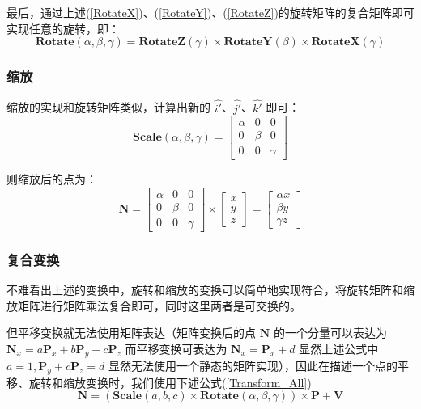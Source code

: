 \documentclass[12pt,oneside,a4paper]{ctexart}
\begin{document}
最后，通过上述(\ref{RotateX})、(\ref{RotateY})、(\ref{RotateZ})的旋转矩阵的复合矩阵即可实现任意的旋转，即：
\begin{equation*}
	\mathbf{Rotate}(\alpha,\beta,\gamma)=\mathbf{RotateZ}(\gamma)\times{}\mathbf{RotateY}(\beta)\times{}\mathbf{RotateX}(\gamma)
\end{equation*}
\subsubsection{缩放}

缩放的实现和旋转矩阵类似，计算出新的 $\hat{i'}$、$\hat{j'}$、$\hat{k'}$ 即可：
\begin{equation*}
	\mathbf{Scale}(\alpha,\beta,\gamma)=\begin{bmatrix}
		\alpha & 0     & 0      \\
		0      & \beta & 0      \\
		0      & 0     & \gamma
	\end{bmatrix}
\end{equation*}

则缩放后的点为：
\begin{equation*}
	\mathbf{N}=\begin{bmatrix}
		\alpha & 0     & 0      \\
		0      & \beta & 0      \\
		0      & 0     & \gamma
	\end{bmatrix}
	\times
	\begin{bmatrix}
		x \\
		y \\
		z
	\end{bmatrix}=
	\begin{bmatrix}
		\alpha{}x \\
		\beta{}y  \\
		\gamma{}z
	\end{bmatrix}
\end{equation*}

\subsubsection{复合变换}
不难看出上述的变换中，旋转和缩放的变换可以简单地实现符合，将旋转矩阵和缩放矩阵进行矩阵乘法复合即可，同时这里两者是可交换的。

但平移变换就无法使用矩阵表达（矩阵变换后的点 $\mathbf{N}$ 的一个分量可以表达为 $\mathbf{N}_x=a\mathbf{P}_x+b\mathbf{P}_y+c\mathbf{P}_z$ 而平移变换可表达为 $\mathbf{N}_x=\mathbf{P}_x+d$ 显然上述公式中 $a=1, \mathbf{P}_y+c\mathbf{P}_z=d$ 显然无法使用一个静态的矩阵实现），因此在描述一个点的平移、旋转和缩放变换时，我们使用下述公式(\ref{Transform_All})
\begin{equation}
	\mathbf{N}=
	(
	\mathbf{Scale}(a,b,c)
	\times
	\mathbf{Rotate}(\alpha,\beta,\gamma)
	)\times
	\mathbf{P}
	+
	\mathbf{V}
	\label{Transform_All}
\end{equation}
\end{document}

